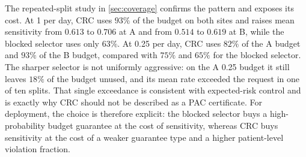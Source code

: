 The repeated-split study in \cref{sec:coverage} confirms the pattern and exposes its cost. At 1 per day, CRC uses $93\%$ of the budget on both sites and raises mean sensitivity from $0.613$ to $0.706$ at A and from $0.514$ to $0.619$ at B, while the blocked selector uses only $63\%$. At 0.25 per day, CRC uses $82\%$ of the A budget and $93\%$ of the B budget, compared with $75\%$ and $65\%$ for the blocked selector. The sharper selector is not uniformly aggressive: on the A 0.25 budget it still leaves $18\%$ of the budget unused, and its mean rate exceeded the request in one of ten splits. That single exceedance is consistent with expected-risk control and is exactly why CRC should not be described as a PAC certificate. For deployment, the choice is therefore explicit: the blocked selector buys a high-probability budget guarantee at the cost of sensitivity, whereas CRC buys sensitivity at the cost of a weaker guarantee type and a higher patient-level violation fraction.
